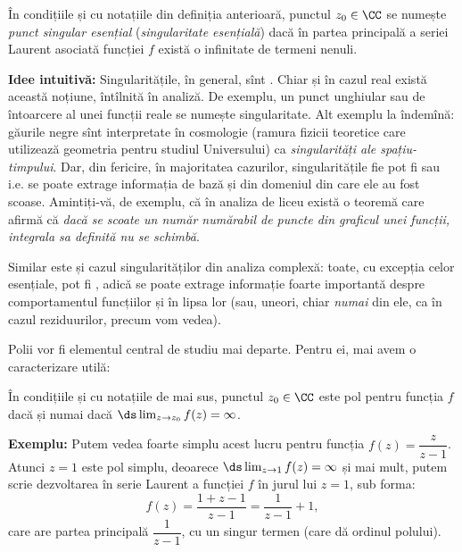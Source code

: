 \begin{definition}\label{def:sing-es}
  În condițiile și cu notațiile din definiția anterioară, punctul $ z_0 \in \CC $
  se numește \emph{punct singular esențial} (\emph{singularitate esențială})
  dacă în partea principală a seriei Laurent asociată funcției $ f $ există o
  infinitate de termeni nenuli.
\end{definition}

\vspace{0.3cm}

\textbf{Idee intuitivă:} Singularitățile, în general, sînt .
Chiar și în cazul real există această noțiune, întîlnită în analiză. De exemplu,
un punct unghiular sau de întoarcere al unei funcții reale se numește singularitate.
Alt exemplu la îndemînă: găurile negre sînt interpretate în cosmologie (ramura fizicii
teoretice care utilizează geometria pentru studiul  Universului) ca
\emph{singularități ale spațiu-timpului}. Dar, din fericire, în majoritatea cazurilor,
singularitățile fie pot fi  sau  i.e. se poate extrage
informația de bază și din domeniul din care ele au fost scoase. Amintiți-vă, de exemplu,
că în analiza de liceu există o teoremă care afirmă că \emph{dacă se scoate un număr numărabil %
  de puncte din graficul unei funcții, integrala sa definită nu se schimbă}.

Similar este și cazul singularităților din analiza complexă: toate, cu excepția
celor esențiale, pot fi , adică se poate extrage informație
foarte importantă despre comportamentul funcțiilor și în lipsa lor (sau, uneori,
chiar \emph{numai} din ele, ca în cazul reziduurilor, precum vom vedea).

\vspace{0.3cm}

Polii vor fi elementul central de studiu mai departe. Pentru ei, mai avem
o caracterizare utilă:

\begin{proposition}\label{pr:pol}
  În condițiile și cu notațiile de mai sus, punctul $ z_0 \in \CC $ este pol pentru
  funcția $ f $ dacă și numai dacă $ \ds\lim_{z \to z_0} f(z) = \infty $.
\end{proposition}

\textbf{Exemplu:} Putem vedea foarte simplu acest lucru pentru funcția
$ f(z) = \dfrac{z}{z - 1} $. Atunci $ z = 1 $ este pol simplu, deoarece
$ \ds\lim_{z \to 1} f(z) = \infty $ și mai mult, putem scrie dezvoltarea
în serie Laurent a funcției $ f $ în jurul lui $ z = 1 $, sub forma:
\[
  f(z) = \dfrac{1 + z - 1}{z - 1} = \dfrac{1}{z - 1} + 1,
\]
care are partea principală $ \dfrac{1}{z - 1} $, cu un singur termen
(care dă ordinul polului).

